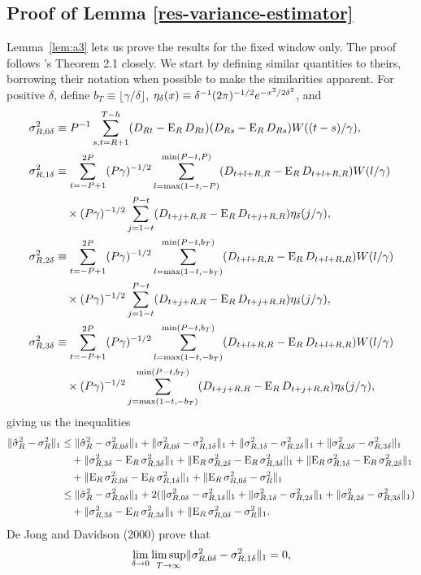 \documentclass[11pt]{article}
\newcommand{\citepos}[1]{\citeauthor{#1}'s \citeyearpar{#1}}
\begin{document}
\subsection*{Proof of Lemma \ref{res-variance-estimator}}
Lemma~\ref{lem:a3} lets us prove the results for the fixed window
only.  The proof follows \citepos{JoD:00} Theorem 2.1 closely.  We
start by defining similar quantities to theirs, borrowing their
notation when possible to make the similarities apparent.  For
positive $\delta$, define $b_T \equiv \lfloor \gamma/\delta \rfloor$,
$\kernelB{x} \equiv \kernelBDefn{x}$, and
\begin{align*}
  \varianceTermI &\equiv
  \varianceTermIDefn,\\ \varianceTermII &\equiv \vtSum
  \varianceTermIIa\\& \quad \times \varianceTermIIb,\\
  \varianceTermIII &\equiv \vtSum \varianceTermIIIa\\
  &\quad \times \varianceTermIIb,\\
  \varianceTermIV &\equiv \vtSum \varianceTermIIIa \\
  &\quad\times \varianceTermIVb,
\end{align*}
giving us the inequalities
\begin{align*}
  \lVert \hat\sigma_R^2 - \sigma_R^2 \rVert_1 &
  \leq \lVert \hat\sigma_R^2 - \varianceTermI \rVert_1 
  + \lVert \varianceTermI - \varianceTermII \rVert_1 
  + \lVert \varianceTermII - \varianceTermIII \rVert_1 
  + \lVert \varianceTermIII - \varianceTermIV \rVert_1\\ & \quad
  + \lVert \varianceTermIV - \E_R \varianceTermIV \rVert_1 
  + \lVert \E_R\varianceTermIII - \E_R\varianceTermIV \rVert_1
  + \lVert \E_R\varianceTermII - \E_R\varianceTermIII \rVert_1\\ & \quad 
  + \lVert \E_R\varianceTermI - \E_R\varianceTermII \rVert_1 
  + \lVert \E_R \varianceTermI - \sigma_R^2 \rVert_1
  \\ &
  \leq  \lVert \hat\sigma_R^2 - \varianceTermI \rVert_1 
  + 2(\lVert \varianceTermI - \varianceTermII \rVert_1 
      + \lVert \varianceTermII - \varianceTermIII \rVert_1 
      + \lVert \varianceTermIII - \varianceTermIV \rVert_1) \\ 
  & \quad + \lVert \varianceTermIV - \E_R \varianceTermIV \rVert_1 
  + \lVert \E_R \varianceTermI - \sigma_R^2 \rVert_1.
\end{align*}
De Jong and Davidson (2000) prove that
\begin{equation} \label{dd1}
\lim_{\delta\to0} \limsup_{T\to\infty} \lVert \varianceTermI -
\varianceTermII\rVert_1 = 0,
\end{equation}
\end{document}
